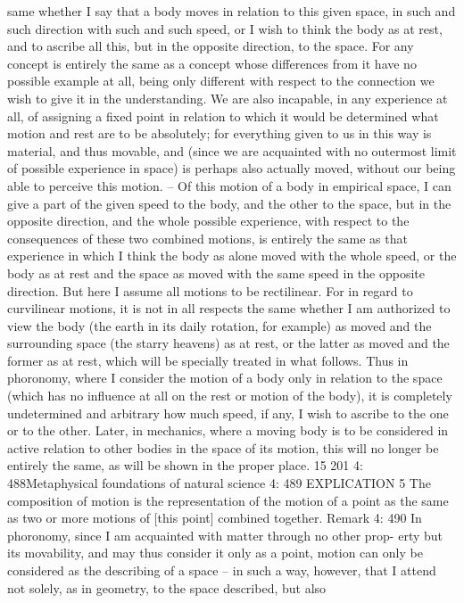 same whether I say that a body moves in relation to this given space,
in such and such direction with such and such speed, or I wish to think
the body as at rest, and to ascribe all this, but in the opposite direction,
to the space. For any concept is entirely the same as a concept whose
differences from it have no possible example at all, being only different
with respect to the connection we wish to give it in the understanding.
We are also incapable, in any experience at all, of assigning a ﬁxed
point in relation to which it would be determined what motion and rest
are to be absolutely; for everything given to us in this way is material, and
thus movable, and (since we are acquainted with no outermost limit of
possible experience in space) is perhaps also actually moved, without our
being able to perceive this motion. – Of this motion of a body in empirical
space, I can give a part of the given speed to the body, and the other to the
space, but in the opposite direction, and the whole possible experience,
with respect to the consequences of these two combined motions, is
entirely the same as that experience in which I think the body as alone
moved with the whole speed, or the body as at rest and the space as
moved with the same speed in the opposite direction. But here I assume
all motions to be rectilinear. For in regard to curvilinear motions, it is not in
all respects the same whether I am authorized to view the body (the earth
in its daily rotation, for example) as moved and the surrounding space
(the starry heavens) as at rest, or the latter as moved and the former as at
rest, which will be specially treated in what follows. Thus in phoronomy,
where I consider the motion of a body only in relation to the space (which
has no inﬂuence at all on the rest or motion of the body), it is completely
undetermined and arbitrary how much speed, if any, I wish to ascribe
to the one or to the other. Later, in mechanics, where a moving body
is to be considered in active relation to other bodies in the space of its
motion, this will no longer be entirely the same, as will be shown in the
proper place. 15
201
4: 488Metaphysical foundations of natural science
4: 489
EXPLICATION 5
The composition of motion is the representation of the motion of a point
as the same as two or more motions of [this point] combined together.
Remark
4: 490
In phoronomy, since I am acquainted with matter through no other prop-
erty but its movability, and may thus consider it only as a point, motion
can only be considered as the describing of a space – in such a way, however,
that I attend not solely, as in geometry, to the space described, but also
